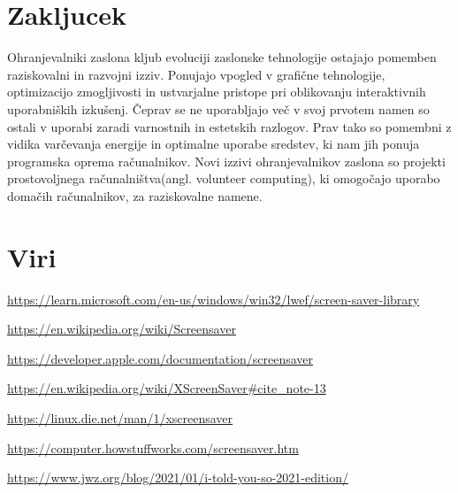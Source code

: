 \documentclass[11pt, oneside]{article}   	%
\begin{document}
\section{Zakljucek}
Ohranjevalniki zaslona kljub evoluciji zaslonske tehnologije ostajajo pomemben raziskovalni in razvojni izziv. Ponujajo vpogled v grafične tehnologije, optimizacijo zmogljivosti in ustvarjalne pristope pri oblikovanju interaktivnih uporabniških izkušenj.
Čeprav se ne uporabljajo več v svoj prvotem namen so ostali v uporabi zaradi varnostnih in estetskih razlogov. Prav tako so pomembni z vidika varčevanja energije in optimalne uporabe sredstev, ki nam jih ponuja programska oprema računalnikov.
Novi izzivi ohranjevalnikov zaslona so projekti prostovoljnega računalništva(angl. volunteer computing), ki omogočajo uporabo domačih računalnikov, za raziskovalne namene.

\section{Viri}
\begin{description}[font=$\bullet$~\normalfont\scshape\color{red!50!black}]
    \item \url {https://learn.microsoft.com/en-us/windows/win32/lwef/screen-saver-library}
    \item \url{https://en.wikipedia.org/wiki/Screensaver}
    \item \url{https://developer.apple.com/documentation/screensaver}
    \item \url{https://en.wikipedia.org/wiki/XScreenSaver#cite_note-13}
    \item \url{https://linux.die.net/man/1/xscreensaver}
    \item \url{https://computer.howstuffworks.com/screensaver.htm}
    \item \url{https://www.jwz.org/blog/2021/01/i-told-you-so-2021-edition/}
    \item \url{}
    \item \url{}
\end{description}
\end{document}
